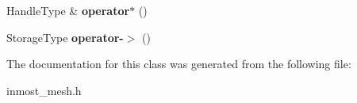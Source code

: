 \begin{DoxyCompactItemize}
\item 
\hypertarget{classINMOST_1_1ElementArray_1_1iterator_afadc7da73e24f64fa4a14dbfe4c44f83}{Handle\-Type \& {\bfseries operator$\ast$} ()}\label{classINMOST_1_1ElementArray_1_1iterator_afadc7da73e24f64fa4a14dbfe4c44f83}

\item 
\hypertarget{classINMOST_1_1ElementArray_1_1iterator_a3168cfa2e3de18178aa55128df623f49}{Storage\-Type {\bfseries operator-\/$>$} ()}\label{classINMOST_1_1ElementArray_1_1iterator_a3168cfa2e3de18178aa55128df623f49}

\end{DoxyCompactItemize}


The documentation for this class was generated from the following file\-:\begin{DoxyCompactItemize}
\item 
inmost\-\_\-mesh.\-h\end{DoxyCompactItemize}

